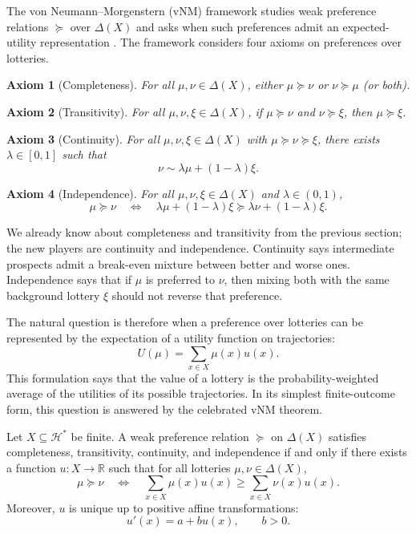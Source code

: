 \documentclass[11pt]{article}
\newtheorem{axiom}{Axiom}
\newcommand{\Hcal}{\mathcal{H}}
\newcommand{\R}{\mathbb{R}}
\newcommand{\pref}{\succcurlyeq}
\newcommand{\indiff}{\sim}
\newcommand{\Lot}{\Delta}
\begin{document}
The von Neumann--Morgenstern (vNM) framework studies weak preference relations
$\pref$ over $\Lot(X)$ and asks when such preferences admit an expected-utility
representation \citep{vonneumann1944theory}. The framework considers four axioms
on preferences over lotteries.

\begin{axiom}[Completeness]
For all $\mu,\nu\in\Lot(X)$, either $\mu\pref \nu$ or $\nu\pref \mu$ (or both).
\end{axiom}

\begin{axiom}[Transitivity]
For all $\mu,\nu,\xi\in\Lot(X)$, if $\mu\pref\nu$ and $\nu\pref\xi$, then $\mu\pref\xi$.
\end{axiom}

\begin{axiom}[Continuity]
For all $\mu,\nu,\xi\in\Lot(X)$ with $\mu\pref\nu\pref\xi$, there exists $\lambda\in[0,1]$ such that
\[
\nu \indiff \lambda \mu + (1-\lambda)\xi.
\]
\end{axiom}

\begin{axiom}[Independence]
For all $\mu,\nu,\xi\in\Lot(X)$ and $\lambda\in(0,1)$,
\[
\mu\pref\nu
\quad\Longleftrightarrow\quad
\lambda \mu + (1-\lambda)\xi \pref \lambda \nu + (1-\lambda)\xi.
\]
\end{axiom}

We already know about completeness and transitivity from the previous section; the
new players are continuity and independence.
Continuity says intermediate prospects admit a break-even mixture between better and worse ones.
Independence says that if $\mu$ is preferred to $\nu$, then mixing both with the same background lottery $\xi$ should not reverse that preference.

The natural question is therefore when a preference over lotteries can be represented by the expectation of a utility function on trajectories:
\[
U(\mu)=\sum_{x\in X}\mu(x)u(x).
\]
This formulation says that the value of a lottery is the probability-weighted
average of the utilities of its possible trajectories.
In its simplest finite-outcome form, this question is answered by the
celebrated vNM theorem.


\begin{theorem}
Let $X\subseteq \Hcal^*$ be finite. A weak preference relation $\pref$ on
$\Lot(X)$ satisfies completeness, transitivity, continuity, and independence if
and only if there exists a function $u\colon X\to\R$ such that for all lotteries
$\mu,\nu\in\Lot(X)$,
\[
\mu\pref\nu
\quad\Longleftrightarrow\quad
\sum_{x\in X}\mu(x)u(x)\geq \sum_{x\in X}\nu(x)u(x).
\]
Moreover, $u$ is unique up to positive affine transformations:
\[
u'(x)=a+bu(x), \qquad b>0.
\]
\end{theorem}
\end{document}
